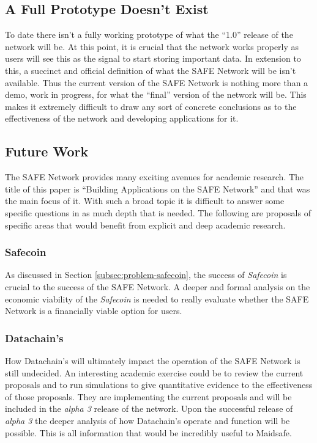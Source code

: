 \subsection{A Full Prototype Doesn't Exist}

To date there isn't a fully working prototype of what the ``1.0'' release of the network will be. At this point, it is crucial that the network works properly as users will see this as the signal to start storing important data. In extension to this, a succinct and official definition of what the SAFE Network will be isn't available. Thus the current version of the SAFE Network is nothing more than a demo, work in progress, for what the ``final'' version of the network will be. This makes it extremely difficult to draw any sort of concrete conclusions as to the effectiveness of the network and developing applications for it.

\subsection{Future Work}

The SAFE Network provides many exciting avenues for academic research. The title of this paper is ``Building Applications on the SAFE Network'' and that was the main focus of it. With such a broad topic it is difficult to answer some specific questions in as much depth that is needed. The following are proposals of specific areas that would benefit from explicit  and deep academic research.

\subsubsection{Safecoin}

As discussed in Section \ref{subsec:problem-safecoin}, the success of \textit{Safecoin} is crucial to the success of the SAFE Network. A deeper and formal analysis on the economic viability of the \textit{Safecoin} is needed to really evaluate whether the SAFE Network is a financially viable option for users.

\subsubsection{Datachain's}

How Datachain's will ultimately impact the operation of the SAFE Network is still undecided. An interesting academic exercise could be to review the current proposals and to run simulations to give quantitative evidence to the effectiveness of those proposals. They are implementing the current proposals and will be included in the \textit{alpha 3} release of the network. Upon the successful release of \textit{alpha 3} the deeper analysis of how Datachain's operate and function will be possible. This is all information that would be incredibly useful to Maidsafe.

